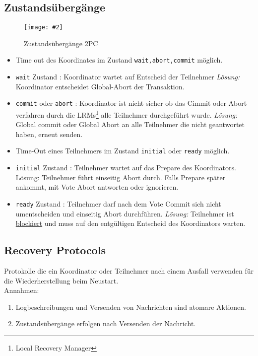 \documentclass[a4paper,10pt,titlepage=false]{scrreprt}
\newcommand{\pic}[2][figure]{\begin{figure}[h]
 \centering
 \texttt{[image: \#2]}
 \caption{#1}
\end{figure}
}
\begin{document}
\subsection{Zustandsübergänge} %
\label{sub:zustands_berg_nge and Termination Protocols}
\pic[Zustandsübergänge 2PC]{zu2pc.png}
\begin{itemize}
  \item Time out des Koordinates im Zustand \texttt{wait,abort,commit} möglich.
  \item \texttt{wait} Zustand :
  \subitem Koordinator wartet auf Entscheid der Teilnehmer
  \subitem \textit{Lösung:} Koordinator entscheidet Global-Abort der Transaktion.
  \item \texttt{commit} oder \texttt{abort} : 
  \subitem Koordinator ist nicht sicher ob das Cimmit oder Abort verfahren durch die LRMs\footnote{Local Recovery Manager} alle Teilnehmer durchgeführt wurde.
  \subitem \textit{Lösung:} Global commit oder Global Abort an alle Teilnehmer die nicht geantwortet haben, erneut senden.
  \item Time-Out eines Teilnehmers im Zustand \texttt{initial} oder \texttt{ready} möglich.
  \item \texttt{initial} Zustand : 
  \subitem Teilnehmer wartet auf das Prepare des Koordinators.
  \subitem Lösung: Teilnehmer führt einseitig Abort durch. Falls Prepare später ankommt, mit Vote Abort antworten oder ignorieren.
  \item \texttt{ready} Zustand : 
  \subitem Teilnehmer darf nach dem Vote Commit sich nicht umentscheiden und einseitig Abort durchführen.
  \subitem \textit{Lösung:} Teilnehmer ist \underline{blockiert} und muss auf den entgültigen Entscheid des Koordinators warten.
\end{itemize}
\subsection{Recovery Protocols} %
\label{sub:recovery_protocols}
Protokolle die ein Koordinator oder Teilnehmer nach einem Ausfall verwenden für die Wiederherstellung beim Neustart. \\
Annahmen: 
\begin{enumerate}
  \item Logbeschreibungen und Versenden von Nachrichten sind atomare Aktionen.
  \item Zustandsübergänge erfolgen nach Versenden der Nachricht.
\end{enumerate}
\end{document}
